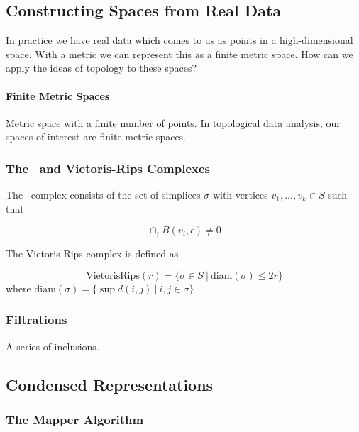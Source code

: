 \subsection{Constructing Spaces from Real Data}

In practice we have real data which comes to us as points in a high-dimensional space.
With a metric we can represent this as a finite metric space.
How can we apply the ideas of topology to these spaces?

\paragraph{Finite Metric Spaces}

Metric space with a finite number of points.
In topological data analysis, our spaces of interest are finite metric spaces.

\subsubsection{The \Cech\ and Vietoris-Rips Complexes}

The \Cech\ complex consists of the set of simplices $\sigma$ with vertices $v_{1},...,v_{k}\in S$ such that

\begin{equation}
\displaystyle\cap_{i}^{} B(v_{i},\epsilon)\neq0
\end{equation}

The Vietoris-Rips complex is defined as

\begin{equation}
\mathrm{VietorisRips}(r) = \{ \sigma\in S\:|\:\mathrm{diam}(\sigma) \leq 2r \}
\end{equation}
where $\mathrm{diam}(\sigma)=\{ \sup d(i,j) \:|\: i,j\in\sigma \}$

\subsubsection{Filtrations}

A series of inclusions.

\subsection{Condensed Representations}

\subsubsection{The Mapper Algorithm}
\label{subsec:mapper}


